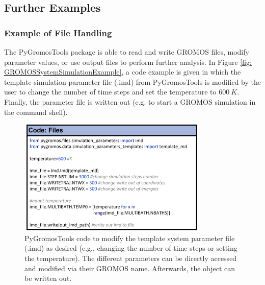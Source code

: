 \subsection{Further Examples}
\subsubsection{Example of File Handling}
The PyGromosTools package is able to read and write GROMOS files, modify parameter values, or use output files to perform further analysis. In Figure \ref{fig: GROMOSSystemSimulationExample}, a code example is given in which the template simulation parameter file (.imd) from PyGromosTools is modified by the user to change the number of time steps and set the temperature to $600~K$. Finally, the parameter file is written out (e.g. to start a GROMOS simulation in the command shell). 

\begin{figure}[h]
    \centering
    \includegraphics[width=0.8\textwidth]{fig/ApplicationExamples/codeExample_GROMOSFiles.png}
    \caption{PyGromosTools code to modify the template system parameter file (.imd) as desired (e.g., changing the number of time steps or setting the temperature). The different parameters can be directly accessed and modified via their GROMOS name. Afterwards, the object can be written out.}
    \label{fig: FileHandlingExampleIMD}
\end{figure}


